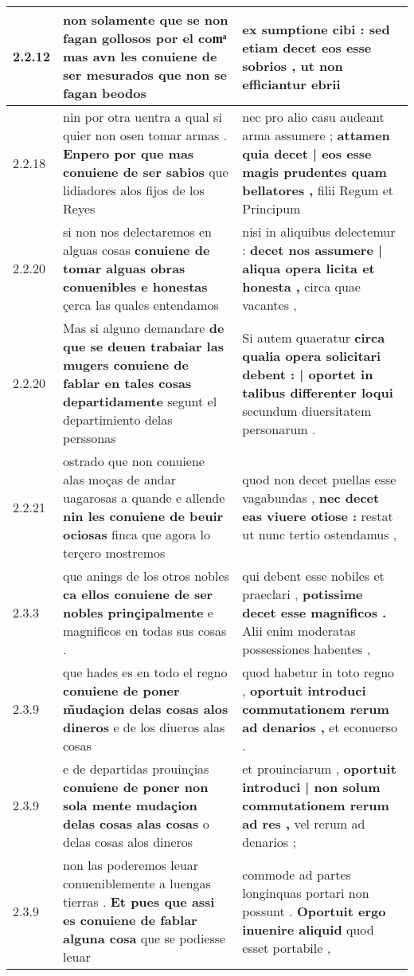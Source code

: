\begin{tabular}{|p{1cm}|p{6.5cm}|p{6.5cm}|}
2.2.12 & non solamente que se non fagan gollosos por el comͣ \textbf{ mas avn les conuiene de ser mesurados } que non se fagan beodos & ex sumptione cibi : \textbf{ sed etiam decet eos esse sobrios , } ut non efficiantur ebrii \\\hline
2.2.18 & nin por otra uentra a qual si quier non osen tomar armas . \textbf{ Enpero por que mas conuiene de ser sabios } que lidiadores alos fijos de los Reyes & nec pro alio casu audeant arma assumere ; \textbf{ attamen quia decet | eos esse magis prudentes quam bellatores , } filii Regum et Principum \\\hline
2.2.20 & si non nos delectaremos en alguas cosas \textbf{ conuiene de tomar alguas obras conuenibles e honestas } çerca las quales entendamos & nisi in aliquibus delectemur : \textbf{ decet nos assumere | aliqua opera licita et honesta , } circa quae vacantes , \\\hline
2.2.20 & Mas si alguno demandare \textbf{ de que se deuen trabaiar las mugers conuiene de fablar en tales cosas departidamente } segunt el departimiento delas perssonas & Si autem quaeratur \textbf{ circa qualia opera solicitari debent : | oportet in talibus differenter loqui } secundum diuersitatem personarum . \\\hline
2.2.21 & ostrado que non conuiene alas moças de andar uagarosas a quande e allende \textbf{ nin les conuiene de beuir ociosas } finca que agora lo terçero mostremos & quod non decet puellas esse vagabundas , \textbf{ nec decet eas viuere otiose : } restat ut nunc tertio ostendamus , \\\hline
2.3.3 & que anings de los otros nobles \textbf{ ca ellos conuiene de ser nobles prinçipalmente } e magnificos en todas sus cosas . & qui debent esse nobiles et praeclari , \textbf{ potissime decet esse magnificos . } Alii enim moderatas possessiones habentes , \\\hline
2.3.9 & que hades es en todo el regno \textbf{ conuiene de poner m̃udaçion delas cosas alos dineros } e de los diueros alas cosas & quod habetur in toto regno , \textbf{ oportuit introduci commutationem rerum ad denarios , } et econuerso . \\\hline
2.3.9 & e de departidas prouinçias \textbf{ conuiene de poner non sola mente mudaçion delas cosas alas cosas } o delas cosas alos dineros & et prouinciarum , \textbf{ oportuit introduci | non solum commutationem rerum ad res , } vel rerum ad denarios ; \\\hline
2.3.9 & non las poderemos leuar conueniblemente a luengas tierras . \textbf{ Et pues que assi es conuiene de fablar alguna cosa } que se podiesse leuar & commode ad partes longinquas portari non possunt . \textbf{ Oportuit ergo inuenire aliquid } quod esset portabile , \\\hline

\end{tabular}
